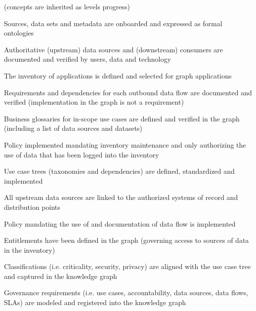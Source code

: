 \kgmmscoringsection

(concepts are inherited as levels progress)

\kgmmscoringlevelOne

\begin{scoring}

  \item Sources, data sets and metadata are onboarded and expressed as formal ontologies
  \item Authoritative (upstream) data sources and (downstream) consumers are documented and verified by users,
        data and technology
  \item The inventory of applications is defined and selected for graph applications
  \item Requirements and dependencies for each outbound data flow are documented and verified (implementation in the
        graph is not a requirement)
  \item Business glossaries for in-scope use cases are defined and verified in the graph (including a list of
        data sources and datasets)
  \item Policy implemented mandating inventory maintenance and only authorizing the use of data that has been logged
        into the inventory

\end{scoring}

\kgmmscoringlevelTwo

\begin{scoring}

  \item Use case trees (taxonomies and dependencies) are defined, standardized and implemented
  \item All upstream data sources are linked to the authorized systems of record and distribution points
  \item Policy mandating the use of  and documentation of data flow is implemented
  \item Entitlements have been defined in the graph (governing access to sources of data in the inventory)
  \item Classifications (i.e. criticality, security, privacy) are aligned with the use case tree and captured in the
        knowledge graph
  \item Governance requirements (i.e. use cases, accountability, data sources, data flows, SLAs) are modeled and
        registered into the knowledge graph

\end{scoring}

